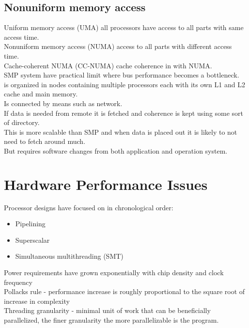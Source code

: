 \documentclass[12pt, a4paper]{article}
\begin{document}
		\subsection{Nonuniform memory access}
			Uniform memory access (UMA) all processors have access to all parts with same access time.\\
			Nonuniform memory access (NUMA) access to all parts with different access time.\\
			Cache-coherent NUMA (CC-NUMA) cache coherence in with NUMA.\\
			SMP system have practical limit where bus performance becomes a bottleneck.\\
			is organized in nodes containing multiple processors each with its own L1 and L2 cache and main memory.\\
			Is connected by means such as network.\\
			If data is needed from remote it is fetched and coherence is kept using some sort of directory.\\
			This is more scalable than SMP and when data is placed out it is likely to not need to fetch around much.\\
			But requires software changes from both application and operation system.
	\section{Hardware Performance Issues}
		Processor designs have focused on in chronological order:
		\begin{itemize}
			\item Pipelining
			\item Superscalar
			\item Simultaneous multithreading (SMT)
		\end{itemize}
		Power requirements have grown exponentially with chip density and clock frequency\\
		Pollacks rule - performance increase is roughly proportional to the square root of increase in complexity\\
		Threading granularity - minimal unit of work that can be beneficially parallelized, the finer granularity the more parallelizable is the program.\\
\end{document}
